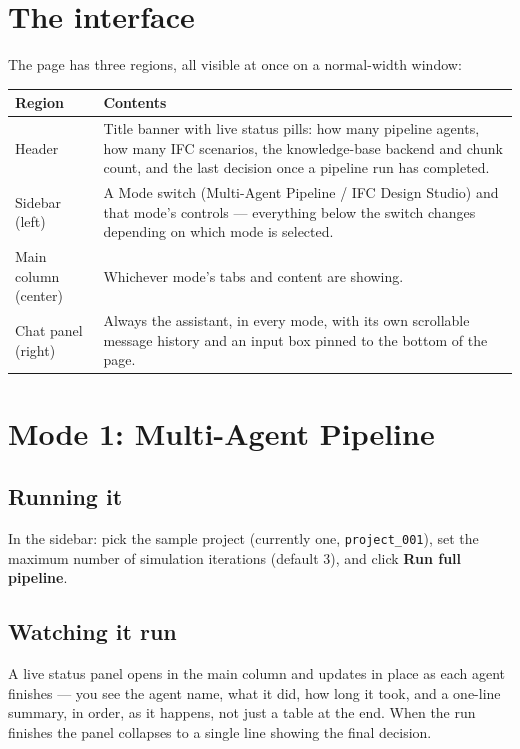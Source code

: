 \documentclass[11pt]{article}
\begin{document}
\section{The interface}
The page has three regions, all visible at once on a normal-width window:
\begin{table}[H]\centering\small
\begin{tabular}{@{}lp{10.5cm}@{}}\toprule
Region & Contents \\ \midrule
Header & Title banner with live status pills: how many pipeline agents, how many IFC scenarios, the knowledge-base
backend and chunk count, and the last decision once a pipeline run has completed. \\
Sidebar (left) & A Mode switch (Multi-Agent Pipeline / IFC Design Studio) and that mode's controls — everything
below the switch changes depending on which mode is selected. \\
Main column (center) & Whichever mode's tabs and content are showing. \\
Chat panel (right) & Always the assistant, in every mode, with its own scrollable message history and an input box
pinned to the bottom of the page. \\ \bottomrule
\end{tabular}\end{table}

\section{Mode 1: Multi-Agent Pipeline}
\subsection{Running it}
In the sidebar: pick the sample project (currently one, \texttt{project\_001}), set the maximum number of
simulation iterations (default 3), and click \textbf{Run full pipeline}.

\subsection{Watching it run}
A live status panel opens in the main column and updates in place as each agent finishes — you see the agent
name, what it did, how long it took, and a one-line summary, in order, as it happens, not just a table at the
end. When the run finishes the panel collapses to a single line showing the final decision.
\end{document}

